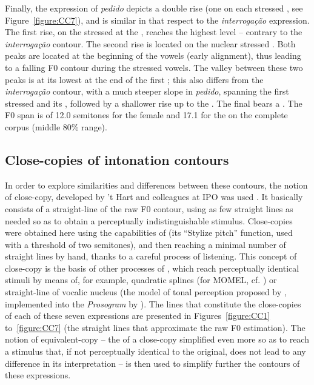 \documentclass[output=paper]{LSP/langsci}
\begin{document}
Finally, the expression of \textit{pedido} depicts a double rise (one on each stressed , see Figure~\ref{figure:CC7}), and is similar in that respect to the \textit{interrogação} expression. 
The first rise, on the stressed  at the , reaches the highest level -- contrary to the \textit{interrogação} contour. 
The second rise is located on the nuclear stressed . 
Both peaks are located at the beginning of the vowels (early alignment), thus leading to a falling F0 contour during the stressed vowels. 
The valley between these two peaks is at its lowest at the end of the first ; this also differs from the \textit{interrogação} contour, with a much steeper slope in \textit{pedido}, spanning the first stressed  and its , followed by a shallower rise up to the . 
The final  bears a . 
The F0 span is of 12.0 semitones for the female and 17.1 for the  on the complete corpus (middle 80\% range).


\subsection{Close-copies of intonation contours}
\label{corpus:CC}

In order to explore similarities and differences between these contours, the notion of close-copy, developed by 't Hart and colleagues at IPO was used \citep{hart1991jasa}. 
It basically consists of a straight-line  of the raw F0 contour, using as few straight lines as needed so as to obtain a perceptually indistinguishable stimulus. 
Close-copies were obtained here using the  capabilities of  (its ``Stylize pitch'' function, used with a threshold of two semitones), and then reaching a minimal number of straight lines by hand, thanks to a careful process of listening. 
This concept of close-copy is the basis of other processes of  , which reach perceptually identical stimuli by means of, for example, quadratic splines (for MOMEL, cf. \citealt{Hirst1993}) or straight-line  of vocalic nucleus (the model of tonal perception proposed by \citealt{dAlessandro1995tonal}, implemented into the \textit{Prosogram} by \citealt{mertens2004outil}). 
The lines that constitute the close-copies of each of these seven expressions are presented in Figures~\ref{figure:CC1} to~\ref{figure:CC7} (the straight lines that approximate the raw F0 estimation). 
The notion of equivalent-copy -- the  of a close-copy simplified even more so as to reach a stimulus that, if not perceptually identical to the original, does not lead to any difference in its interpretation -- is then used to simplify further the contours of these expressions.
\end{document}

